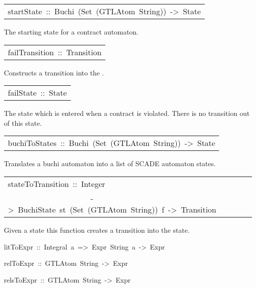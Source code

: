 \begin{haddockdesc}
\item[\begin{tabular}{@{}l}
startState\ ::\ Buchi\ (Set\ (GTLAtom\ String))\ ->\ State
\end{tabular}]\haddockbegindoc
The starting state for a contract automaton.
\par

\end{haddockdesc}
\begin{haddockdesc}
\item[\begin{tabular}{@{}l}
failTransition\ ::\ Transition
\end{tabular}]\haddockbegindoc
Constructs a transition into the .
\par

\end{haddockdesc}
\begin{haddockdesc}
\item[\begin{tabular}{@{}l}
failState\ ::\ State
\end{tabular}]\haddockbegindoc
The state which is entered when a contract is violated.
   There is no transition out of this state.
\par

\end{haddockdesc}
\begin{haddockdesc}
\item[\begin{tabular}{@{}l}
buchiToStates\ ::\ Buchi\ (Set\ (GTLAtom\ String))\ ->\ {\char 91}State{\char 93}
\end{tabular}]\haddockbegindoc
Translates a buchi automaton into a list of SCADE automaton states.
\par

\end{haddockdesc}
\begin{haddockdesc}
\item[\begin{tabular}{@{}l}
stateToTransition\ ::\ Integer\\\ \ \ \ \ \ \ \ \ \ \ \ \ \ \ \ \ \ \ \ \ ->\ BuchiState\ st\ (Set\ (GTLAtom\ String))\ f\ ->\ Transition
\end{tabular}]\haddockbegindoc
Given a state this function creates a transition into the state.
\par

\end{haddockdesc}
\begin{haddockdesc}
\item[
litToExpr\ ::\ Integral\ a\ =>\ Expr\ String\ a\ ->\ Expr
]
\item[
relToExpr\ ::\ GTLAtom\ String\ ->\ Expr
]
\item[
relsToExpr\ ::\ {\char 91}GTLAtom\ String{\char 93}\ ->\ Expr
]
\end{haddockdesc}